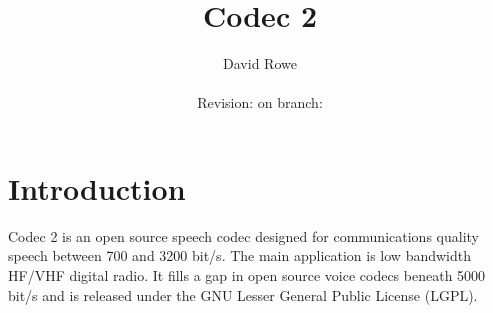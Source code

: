 \documentclass{article}
\title{Codec 2}
\author{David Rowe\\ \\ Revision: {\gitrevision} on branch: {\branch}}
\begin{document}


\newcommand{\drawSine}[4]{%

\draw plot [smooth] coordinates {(#1-2*#3, #2 )       (#1-1.5*#3,#2+0.707*#4)
                                 (#1-1*#3, #2+1*#4)   (#1-0.5*#3,#2+0.707*#4)
                                 (#1  ,#2+0)          (#1+0.5*#3,#2-0.707*#4) 
                                 (#1+1*#3,#2-1*#4)    (#1+1.5*#3,#2-0.707*#4)
                                 (#1+2*#3,#2+0)}
}

\newcommand{\drawSummer}[2]{%
	\draw (#1,#2) circle (0.5);
	\draw (#1-0.25,#2) -- (#1+0.25,#2);
	\draw (#1,#2-0.25) -- (#1,#2+0.25);
}

\maketitle

\section{Introduction}

Codec 2 is an open source speech codec designed for communications quality speech between 700 and 3200 bit/s. The main application is low bandwidth HF/VHF digital radio. It fills a gap in open source voice codecs beneath 5000 bit/s and is released under the GNU Lesser General Public License (LGPL).
\end{document}

